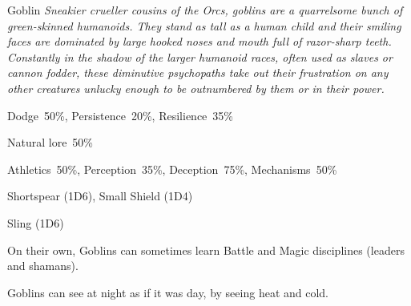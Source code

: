 \begin{monsterbox}{Goblin}
	\textit{Sneakier crueller cousins of the Orcs, goblins are a quarrelsome bunch of green-skinned humanoids. They stand as tall as a human child and their smiling faces are dominated by large hooked noses and mouth full of razor-sharp teeth. Constantly in the shadow of the larger humanoid races, often used as slaves or cannon fodder, these diminutive psychopaths take out their frustration on any other creatures unlucky enough to be outnumbered by them or in their power.}\\
	\rpghline
	\basics[%
        hitpoints  = 9, %
	majorwound = 5,
	damagemodifier = 0,
	powerpoints = 10,
	movementrate = 15m,
	armor = Leather (2AP),
	plunderrating = 1
	]
	\rpghline%
	\stats[ %
		STR = 2D6+3 (10),
		CON = 2D6+3 (10),
		DEX = 5D6   (17),
		SIZ = 2D6   (7),
		INT = 3D6   (11),
		POW = 2D6+3 (10),
		CHA = 2D6   (7)
	]
	\rpghline%
	\begin{rpg-monsteraction}[Resistances]
		Dodge~50\%, Persistence~20\%, Resilience~35\%
	\end{rpg-monsteraction}
	\begin{rpg-monsteraction}[Knowledge]
    		Natural lore~50\%
	\end{rpg-monsteraction}
	\begin{rpg-monsteraction}[Practical]
		Athletics~50\%, Perception~35\%, Deception~75\%, Mechanisms~50\%
	\end{rpg-monsteraction}
	\begin{rpg-monsteraction}
		Shortspear (1D6), Small Shield (1D4)
	\end{rpg-monsteraction}
	\begin{rpg-monsteraction}
		Sling (1D6)
	\end{rpg-monsteraction}
	\begin{rpg-monsteraction}[Supernatural]
		On their own, Goblins can sometimes learn Battle and Magic disciplines (leaders and shamans).
	\end{rpg-monsteraction}
	\begin{rpg-monsteraction}[Thermoception]
		Goblins can see at night as if it was day, by seeing heat and cold.
	\end{rpg-monsteraction}

\end{monsterbox}

